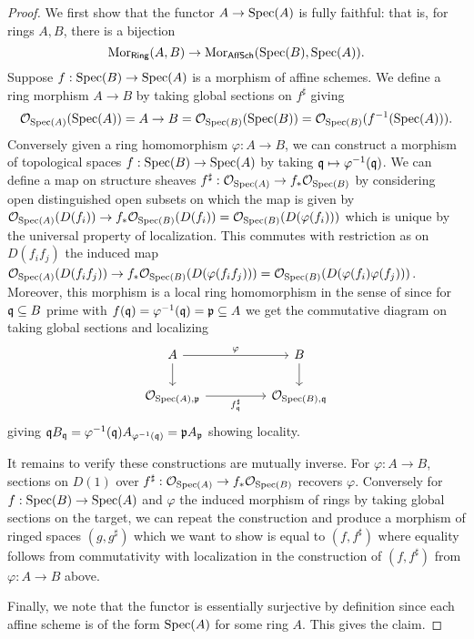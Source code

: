 \begin{proof}
    We first show that the functor $A\to\operatorname{Spec}(A)$ is fully faithful: that is, for rings $A,B$, there is a bijection 
    $$\mathrm{Mor}_{\mathsf{Ring}}(A,B)\to\mathrm{Mor}_{\mathsf{AffSch}}(\operatorname{Spec}(B),\operatorname{Spec}(A)).$$
    Suppose $f:\operatorname{Spec}(B)\to\operatorname{Spec}(A)$ is a morphism of affine schemes. We define a ring morphism $A\to B$ by taking global sections on $f^{\sharp}$ giving 
    $$\mathcal{O}_{\operatorname{Spec}(A)}(\operatorname{Spec}(A))=A\to B=\mathcal{O}_{\operatorname{Spec}(B)}(\operatorname{Spec}(B))=\mathcal{O}_{\operatorname{Spec}(B)}(f^{-1}(\operatorname{Spec}(A))).$$
    Conversely given a ring homomorphism $\varphi:A\to B$, we can construct a morphism of topological spaces $f:\operatorname{Spec}(B)\to\operatorname{Spec}(A)$ by taking $\mathfrak{q}\mapsto\varphi^{-1}(\mathfrak{q})$. We can define a map on structure sheaves $f^{\sharp}:\mathcal{O}_{\operatorname{Spec}(A)}\to f_{*}\mathcal{O}_{\operatorname{Spec}(B)}$ by considering open distinguished open subsets on which the map is given by $\mathcal{O}_{\operatorname{Spec}(A)}(D(f_{i}))\to f_{*}\mathcal{O}_{\operatorname{Spec}(B)}(D(f_{i}))=\mathcal{O}_{\operatorname{Spec}(B)}(D(\varphi(f_{i})))$ which is unique by the universal property of localization. This commutes with restriction as on $D(f_{i}f_{j})$ the induced map $\mathcal{O}_{\operatorname{Spec}(A)}(D(f_{i}f_{j}))\to f_{*}\mathcal{O}_{\operatorname{Spec}(B)}(D(\varphi(f_{i}f_{j})))=\mathcal{O}_{\operatorname{Spec}(B)}(D(\varphi(f_{i})\varphi(f_{j})))$. Moreover, this morphism is a local ring homomorphism in the sense of  since for $\mathfrak{q}\subseteq B$ prime with $f(\mathfrak{q})=\varphi^{-1}(\mathfrak{q})=\mathfrak{p}\subseteq A$ we get the commutative diagram on taking global sections and localizing 
    $$%
    \begin{tikzcd}
        A && B \\
        {\Ocal_{\spec(A),\pfrak}} && {\Ocal_{\spec(B),\qfrak}}
        \arrow["\varphi", from=1-1, to=1-3]
        \arrow[from=1-1, to=2-1]
        \arrow[from=1-3, to=2-3]
        \arrow["{f^{\sharp}_{\qfrak}}"', from=2-1, to=2-3]
    \end{tikzcd}$$
    giving $\mathfrak{q} B_{\mathfrak{q}}=\varphi^{-1}(\mathfrak{q})A_{\varphi^{-1}(\mathfrak{q})}=\mathfrak{p} A_{\mathfrak{p}}$ showing locality. 

    It remains to verify these constructions are mutually inverse. For $\varphi:A\to B$, sections on $D(1)$ over $f^{\sharp}:\mathcal{O}_{\operatorname{Spec}(A)}\to f_{*}\mathcal{O}_{\operatorname{Spec}(B)}$ recovers $\varphi$. Conversely for $f:\operatorname{Spec}(B)\to\operatorname{Spec}(A)$ and $\varphi$ the induced morphism of rings by taking global sections on the target, we can repeat the construction and produce a morphism of ringed spaces $(g,g^{\sharp})$ which we want to show is equal to $(f,f^{\sharp})$ where equality follows from commutativity with localization in the construction of $(f,f^{\sharp})$ from $\varphi:A\to B$ above. 

    Finally, we note that the functor is essentially surjective by definition since each affine scheme is of the form $\operatorname{Spec}(A)$ for some ring $A$. This gives the claim. 
\end{proof}
